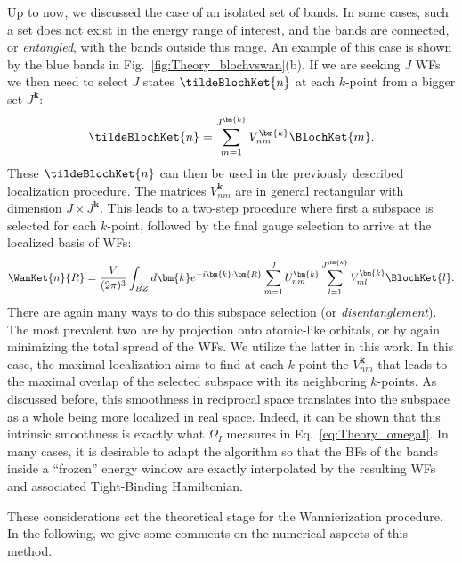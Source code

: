 Up to now, we discussed the case of an isolated set of bands. In some cases, such a set does not exist in the energy range of interest, and the bands are connected, or {\it entangled}, with the bands outside this range.
An example of this case is shown by the blue bands in Fig.~\ref{fig:Theory_blochvswan}(b).
If we are seeking $J$ \glspl{WF} we then need to select $J$ states $\tildeBlochKet{n}$ at each $k$-point from a bigger set $J^{\bm{k}}$:
\begin{equation}
	\tildeBlochKet{n} = \sum_{m=1}^{J^{\bm{k}}}V_{nm}^{\bm{k}} \BlochKet{m}.
\end{equation}
These $\tildeBlochKet{n}$ can then be used in the previously described localization procedure.
The matrices $V_{nm}^{\bm{k}}$ are in general rectangular with dimension $J\times J^{\bm{k}}$.
This leads to a two-step procedure where first a subspace is selected for each $k$-point, followed by the final gauge selection to arrive at the localized basis of \glspl{WF}:
\begin{equation}
	\label{eq:Theory_fullwan}
	\WanKet{n}{R} = \frac{V}{(2\pi)^3} \int_{BZ} d\bm{k} e^{-i \bm{k} \cdot \bm{R}} \sum_{m=1}^J U^{\bm{k}}_{nm} \sum_{l=1}^{J^{\bm{k}}} V_{ml}^{\bm{k}} \BlochKet{l}.
\end{equation}
There are again many ways to do this subspace selection (or {\it disentanglement}).
The most prevalent two are by projection onto atomic-like orbitals, or by again minimizing the total spread of the \glspl{WF}.
We utilize the latter in this work.
In this case, the maximal localization aims to find at each $k$-point the $V_{nm}^{\bm{k}}$ that leads to the maximal overlap of the selected subspace with its neighboring $k$-points.
As discussed before, this smoothness in reciprocal space translates into the subspace as a whole being more localized in real space.
Indeed, it can be shown \cite{Marzari2012} that this intrinsic smoothness is exactly what $\Omega_I$ measures in Eq.~\eqref{eq:Theory_omegaI}. 
In many cases, it is desirable to adapt the algorithm so that the \glspl{BF} of the bands inside a ``frozen'' energy window are exactly interpolated by the resulting \glspl{WF} and associated Tight-Binding Hamiltonian.

These considerations set the theoretical stage for the Wannierization procedure. In the following, we give some comments on the numerical aspects of this method.

